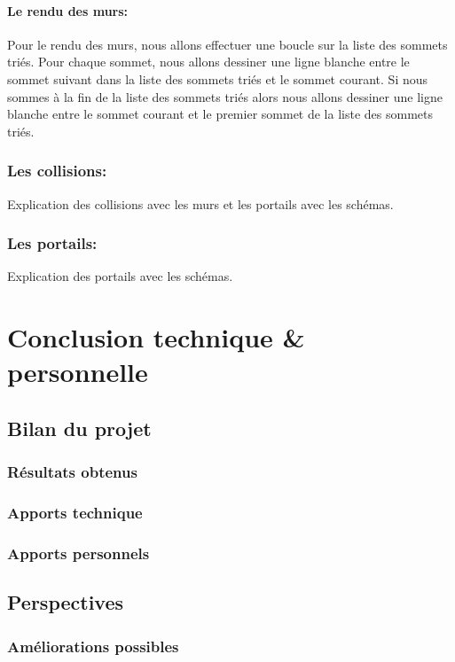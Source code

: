 \documentclass[12pt]{report}
\begin{document}
\paragraph{Le rendu des murs:}
Pour le rendu des murs, nous allons effectuer une boucle sur la liste des sommets
triés. Pour chaque sommet, nous allons dessiner une ligne blanche entre le sommet
suivant dans la liste des sommets triés et le sommet courant. Si nous sommes à
la fin de la liste des sommets triés alors nous allons dessiner une ligne blanche
entre le sommet courant et le premier sommet de la liste des sommets triés.

\subsubsection{Les collisions:}

Explication des collisions avec les murs et les portails avec les schémas.

\subsubsection{Les portails:}

Explication des portails avec les schémas.


\section{Conclusion technique \& personnelle}
\subsection{Bilan du projet}
\subsubsection{Résultats obtenus}
\subsubsection{Apports technique}
\subsubsection{Apports personnels}

\subsection{Perspectives}
\subsubsection{Améliorations possibles}
\end{document}
